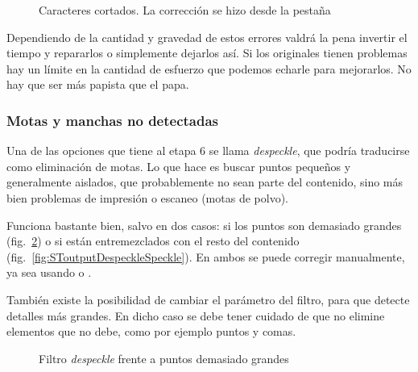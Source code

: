 \documentclass[%
	a5paper,
	10pt,
	twoside,
	openright,
	final,
]{memoir}
\begin{document}
{	\begin{figure}
		\hfill
		\hfill
		\caption[Caracteres cortados]{Caracteres cortados. La corrección se hizo desde la pestaña \label{fig:SToutputBadChars}}
	\end{figure}

	Dependiendo de la cantidad y gravedad de estos errores valdrá la pena invertir el tiempo y repararlos o simplemente dejarlos así. %
	Si los originales tienen problemas hay un límite en la cantidad de esfuerzo que podemos echarle para mejorarlos. No hay que ser más papista que el papa. %

	\subsubsection{Motas y manchas no detectadas} Una de las opciones que tiene al etapa 6 se llama \emph{despeckle}, que podría traducirse como eliminación de motas. Lo que hace es buscar puntos pequeños y generalmente aislados, que probablemente no sean parte del contenido, sino más bien problemas de impresión o escaneo (motas de polvo).

	Funciona bastante bien, salvo en dos casos: si los puntos son demasiado grandes (fig.~\ref{fig:SToutputDespeckleSpot}) o si están entremezclados con el resto del contenido (fig.~\ref{fig:SToutputDespeckleSpeckle}). En ambos se puede corregir manualmente, ya sea usando \gimp o .

	También existe la posibilidad de cambiar el parámetro del filtro, para que detecte detalles más grandes. En dicho caso se debe tener cuidado de que no elimine elementos que no debe, como por ejemplo puntos y comas.

	\begin{figure}
		\hfill
		\caption{Filtro \emph{despeckle} frente a puntos demasiado grandes\label{fig:SToutputDespeckleSpot}}
	\end{figure}

}
\end{document}
